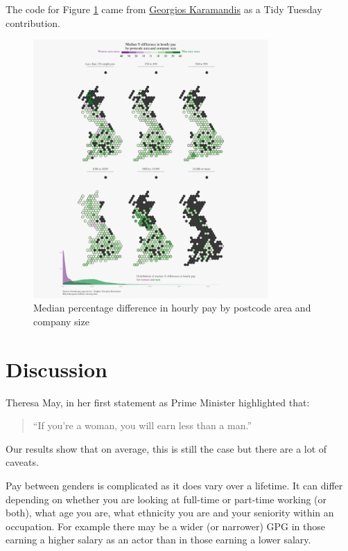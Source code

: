 \documentclass[
  11pt,
  letterpaper,
  DIV=11,
  numbers=noendperiod]{scrartcl}
\begin{document}
The code for Figure \ref{fig:makefigure} came from
\href{https://github.com/gkaramanis/tidytuesday/tree/master/2022/2022-week_26}{Georgios
Karamandis} as a Tidy Tuesday contribution.

\begin{figure}[H]

{\centering \includegraphics[width=0.8\textwidth,height=\textheight]{gender_pay_gap_files/figure-pdf/geomaps-1.pdf}

}

\caption{\label{fig:makefigure} Median percentage difference in hourly
pay by postcode area and company size}

\end{figure}%

\newpage

\section{Discussion}\label{discussion}

Theresa May, in her first statement as Prime Minister highlighted that:

\begin{quote}
``If you're a woman, you will earn less than a man.''
\end{quote}

Our results show that on average, this is still the case but there are a
lot of caveats.

Pay between genders is complicated as it does vary over a lifetime. It
can differ depending on whether you are looking at full-time or
part-time working (or both), what age you are, what ethnicity you are
and your seniority within an occupation. For example there may be a
wider (or narrower) GPG in those earning a higher salary as an actor
than in those earning a lower salary.
\end{document}
